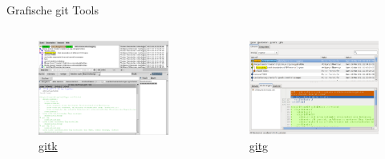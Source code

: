 \begin{frame}[allowframebreaks]{Grafische git Tools}
  \begin{columns}
    \begin{column}{0.56\textwidth}
      \begin{figure}
        \includegraphics[width=\textwidth]{img/gitk}
        \caption{\href{http://www.kernel.org/pub/software/scm/git/docs/gitk.html}{gitk}}
      \end{figure}
    \end{column}
    \begin{column}{0.56\textwidth}
      \begin{figure}
        \includegraphics[width=\textwidth]{img/gitg}
        \caption{\href{http://trac.novowork.com/gitg}{gitg}}
      \end{figure}
    \end{column}
  \end{columns}
  

\end{frame}
